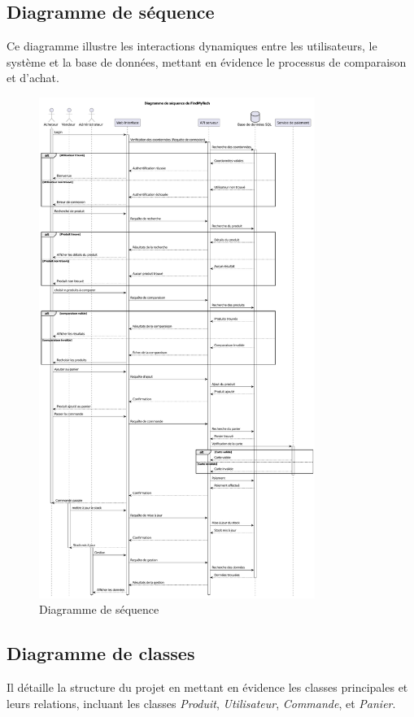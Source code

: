 \documentclass[a4paper,12pt]{article}
\begin{document}
\subsection{Diagramme de séquence}
Ce diagramme illustre les interactions dynamiques entre les utilisateurs, le système et la base de données, mettant en évidence le processus de comparaison et d’achat.
\begin{figure}
    \centering
    \includegraphics[width=0.8\textwidth]{out/diagrammes/diagramme_de_sequence.pdf}
    \caption{Diagramme de séquence}
\end{figure}

\clearpage

\subsection{Diagramme de classes}
Il détaille la structure du projet en mettant en évidence les classes principales et leurs relations, incluant les classes \textit{Produit}, \textit{Utilisateur}, \textit{Commande}, et \textit{Panier}.
\end{document}
